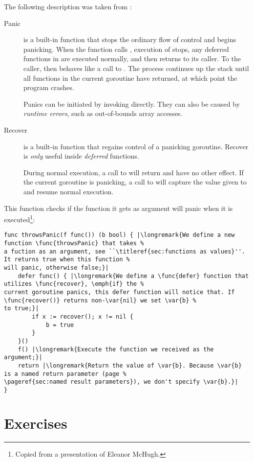 The following description was taken from \cite{go_blog_panic}:
\begin{description}
\item[Panic]{is a built-in function that stops the ordinary flow of control and begins panicking. When the function 
 calls ,
execution of  stops, any deferred functions in  are executed normally, and 
then  returns to its caller. To the caller,  then
behaves like a call to . The process continues up the stack until all functions in the current 
goroutine have returned, at which point the program crashes. 

Panics can be initiated by invoking  directly. They can also be caused by \emph{runtime errors}, such
as out-of-bounds array accesses.}

\item[Recover]{is a built-in function that regains control of a panicking goroutine. Recover is \emph{only} useful inside 
\emph{deferred} functions.

During normal execution, a call to  will return  and have no other effect. 
If the current goroutine is panicking, a call
to  will capture the value given to  and resume normal execution.}
\end{description}

This function checks if the function it gets as argument will panic when it is
executed\footnote{Copied from a presentation of Eleanor McHugh.}:
\begin{lstlisting}
func throwsPanic(f func()) (b bool) { |\longremark{We define a new function \func{throwsPanic} that takes %
a fuction as an argument, see ``\titleref{sec:functions as values}''. It returns true when this function %
will panic, otherwise false;}|
    defer func() { |\longremark{We define a \func{defer} function that utilizes \func{recover}, \emph{if} the %
current goroutine panics, this defer function will notice that. If \func{recover()} returns non-\var{nil} we set \var{b} %
to true;}|
        if x := recover(); x != nil {
            b = true
        }
    }()
    f() |\longremark{Execute the function we received as the argument;}|
    return |\longremark{Return the value of \var{b}. Because \var{b} is a named return parameter (page %
\pageref{sec:named result parameters}), we don't specify \var{b}.}|
}
\end{lstlisting}
\showremarks


\section{Exercises}


